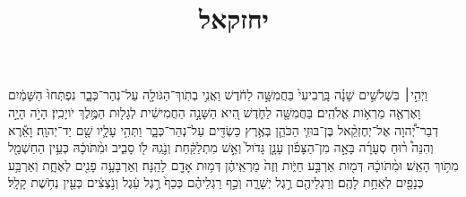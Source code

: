 \documentclass{openreader}
\title{יחזקאל}
\date{}
\begin{document}
\maketitle
\raggedbottom 
\fontsize{16pt}{24pt}\selectfont


וַיְהִ֣י׀ בִּשְׁלֹשִׁ֣ים שָׁנָ֗ה בָּֽרְבִיעִי֙ בַּחֲמִשָּׁ֣ה לַחֹ֔דֶשׁ וַאֲנִ֥י בְתֹֽוךְ־הַגֹּולָ֖ה עַל־נְהַר־כְּבָ֑ר נִפְתְּחוּ֙ הַשָּׁמַ֔יִם וָאֶרְאֶ֖ה מַרְאֹ֥ות אֱלֹהִֽים׃ 
בַּחֲמִשָּׁ֖ה לַחֹ֑דֶשׁ הִ֚יא הַשָּׁנָ֣ה הַחֲמִישִׁ֔ית לְגָל֖וּת הַמֶּ֥לֶךְ יֹויָכִֽין׃ 
הָיֹ֣ה הָיָ֣ה דְבַר־יְ֠הוָה אֶל־יְחֶזְקֵ֨אל בֶּן־בּוּזִ֧י הַכֹּהֵ֛ן בְּאֶ֥רֶץ כַּשְׂדִּ֖ים עַל־נְהַר־כְּבָ֑ר וַתְּהִ֥י עָלָ֛יו שָׁ֖ם יַד־יְהוָֽה׃ 
וָאֵ֡רֶא וְהִנֵּה֩ ר֨וּחַ סְעָרָ֜ה בָּאָ֣ה מִן־הַצָּפֹ֗ון עָנָ֤ן גָּדֹול֙ וְאֵ֣שׁ מִתְלַקַּ֔חַת וְנֹ֥גַֽהּ לֹ֖ו סָבִ֑יב וּמִ֨תֹּוכָ֔הּ כְּעֵ֥ין הַחַשְׁמַ֖ל מִתֹּ֥וךְ הָאֵֽשׁ׃ 
וּמִ֨תֹּוכָ֔הּ דְּמ֖וּת אַרְבַּ֣ע חַיֹּ֑ות וְזֶה֙ מַרְאֵֽיהֶ֔ן דְּמ֥וּת אָדָ֖ם לָהֵֽנָּה׃ 
וְאַרְבָּעָ֥ה פָנִ֖ים לְאֶחָ֑ת וְאַרְבַּ֥ע כְּנָפַ֖יִם לְאַחַ֥ת לָהֶֽם׃ 
וְרַגְלֵיהֶ֖ם רֶ֣גֶל יְשָׁרָ֑ה וְכַ֣ף רַגְלֵיהֶ֗ם כְּכַף֙ רֶ֣גֶל עֵ֔גֶל וְנֹ֣צְצִ֔ים כְּעֵ֖ין נְחֹ֥שֶׁת קָלָֽל׃ 
\end{document}
